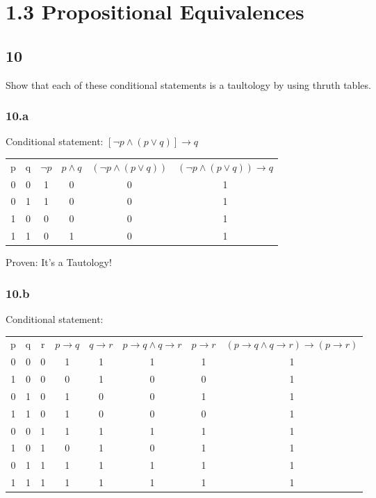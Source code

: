 \documentclass[12pt]{article}
\begin{document}
  \section{1.3 Propositional Equivalences}
\subsection{10}
Show that each of these conditional statements is a taultology by using thruth tables.
\subsubsection{10.a}
Conditional statement: $[\neg p \wedge (p \vee q)] \rightarrow q$\newline
\begin{table}[tbh]
  \begin{tabular}{cccccc}
    p  & q  & $\neg p$ & $p \wedge q$  & $(\neg p \wedge (p \vee q))$ &$(\neg p \wedge (p \vee q)) \rightarrow q$  \\
    0  & 0  & 1        & 0 & 0 &1\\
    0  & 1  & 1        & 0 & 0 &1\\
    1  & 0  & 0        & 0 & 0 &1\\
    1  & 1  & 0        & 1 & 0 &1\\ 
  \end{tabular}
\end{table}
Proven: It's a Tautology!
\subsubsection{10.b}
Conditional statement: 

\begin{table}[tbh]
  \begin{tabular}{cccccccc}
    p  & q  & r &$p \rightarrow q$ & $q \rightarrow r$&$p \rightarrow q \wedge q \rightarrow r$&$p \rightarrow r$&$(p \rightarrow q \wedge q \rightarrow r) \rightarrow (p \rightarrow r) $\\
    0& 0& 0& 1& 1& 1& 1& 1\\
    1& 0& 0& 0& 1& 0& 0& 1\\
    0& 1& 0& 1& 0& 0& 1& 1\\
    1& 1& 0& 1& 0& 0& 0& 1\\
    0& 0& 1& 1& 1& 1& 1& 1\\
    1& 0& 1& 0& 1& 0& 1& 1\\
    0& 1& 1& 1& 1& 1& 1& 1\\
    1& 1& 1& 1& 1& 1& 1& 1
  \end{tabular}
\end{table}
\end{document}
